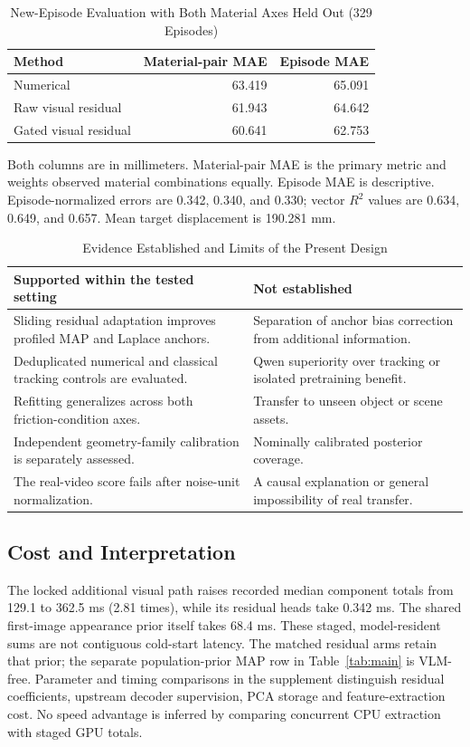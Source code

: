 \documentclass{ieeeaccess}
\begin{document}
\begin{table}[t]\caption{New-Episode Evaluation with Both Material Axes Held Out (329 Episodes)}\label{tab:group}\centering
\begin{tabular}{lrr}\toprule Method & Material-pair MAE & Episode MAE\\\midrule
Numerical & 63.419 & 65.091\\
Raw visual residual & 61.943 & 64.642\\
Gated visual residual & 60.641 & 62.753\\\bottomrule
\end{tabular}
\par\small Both columns are in millimeters. Material-pair MAE is the primary metric and weights observed material combinations equally. Episode MAE is descriptive. Episode-normalized errors are 0.342, 0.340, and 0.330; vector $R^2$ values are 0.634, 0.649, and 0.657. Mean target displacement is 190.281 mm.
\end{table}

\begin{table}[!t]\centering\small
\caption{Evidence Established and Limits of the Present Design}\label{tab:scope}
\begin{tabular}{p{}p{}}\toprule
Supported within the tested setting & Not established\\\midrule
Sliding residual adaptation improves profiled MAP and Laplace anchors. & Separation of anchor bias correction from additional information.\\
Deduplicated numerical and classical tracking controls are evaluated. & Qwen superiority over tracking or isolated pretraining benefit.\\
Refitting generalizes across both friction-condition axes. & Transfer to unseen object or scene assets.\\
Independent geometry-family calibration is separately assessed. & Nominally calibrated posterior coverage.\\
The real-video score fails after noise-unit normalization. & A causal explanation or general impossibility of real transfer.\\
\bottomrule\end{tabular}
\end{table}

\subsection{Cost and Interpretation}
The locked additional visual path raises recorded median component totals from 129.1 to 362.5 ms (2.81 times), while its residual heads take 0.342 ms. The shared first-image appearance prior itself takes 68.4 ms. These staged, model-resident sums are not contiguous cold-start latency. The matched residual arms retain that prior; the separate population-prior MAP row in Table~\ref{tab:main} is VLM-free. Parameter and timing comparisons in the supplement distinguish residual coefficients, upstream decoder supervision, PCA storage and feature-extraction cost. No speed advantage is inferred by comparing concurrent CPU extraction with staged GPU totals.
\end{document}

